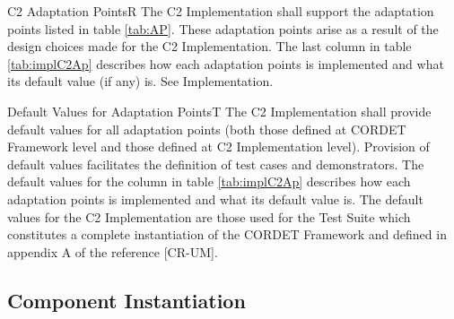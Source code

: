 \documentclass{pnp_article}
\begin{document}
\begin{fwReq}{C2 Adaptation Points}{R}
{The C2 Implementation shall support the adaptation points listed in table \ref{tab:AP}.}
{These adaptation points arise as a result of the design choices made for the C2 Implementation.}
{The last column in table \ref{tab:implC2Ap} describes how each adaptation points is implemented and what its default value (if any) is. } 
{See Implementation.}
\end{fwReq}


\begin{fwReq}{Default Values for Adaptation Points}{T}
{The C2 Implementation shall provide default values for all adaptation points (both those defined at CORDET Framework level and those defined at C2 Implementation level).}
{Provision of default values facilitates the definition of test cases and demonstrators.}
{The default values for the  column in table \ref{tab:implC2Ap} describes how each adaptation points is implemented and what its default value is. } 
{The default values for the C2 Implementation are those used for the Test Suite which constitutes a complete instantiation of the CORDET Framework and defined in appendix A of the reference [CR-UM].}
\end{fwReq}


\subsection{Component Instantiation}
\end{document}

